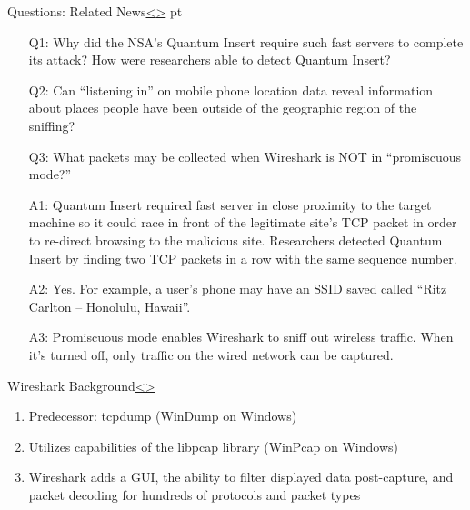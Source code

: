 \documentclass[12pt]{extarticle}
\newenvironment{instructionblock}{\Large\bgroup}{\egroup}
\newcounter{questionEnumerate}
\begin{document}
\pagebreak
\begin{slide}{Questions: Related News}{\hyperref[slide 7]{\textless}\hyperref[slide 9]{\textgreater}}
	 pt
	\begin{instructionblock}
		\begin{enumerate}
			\item[Q1:] Why did the NSA's Quantum Insert require such fast servers to complete its attack? How were researchers able to detect Quantum Insert?
			\item[Q2:] Can ``listening in'' on mobile phone location data reveal information about places people have been outside of the geographic region of the sniffing? 
			\item[Q3:] What packets may be collected when Wireshark is NOT in ``promiscuous mode?''
		\end{enumerate}
	\end{instructionblock}
\end{slide}
\vfill

\begin{enumerate}
	\item[A1:] Quantum Insert required fast server in close proximity to the target machine so it could race in front of the legitimate site's TCP packet in order to re-direct browsing to the malicious site. Researchers detected Quantum Insert by finding two TCP packets in a row with the same sequence number.
	\item[A2:] Yes. For example, a user's phone may have an SSID saved called ``Ritz Carlton -- Honolulu, Hawaii''.
	\item[A3:] Promiscuous mode enables Wireshark to sniff out wireless traffic. When it's turned off, only traffic on the wired network can be captured.
\end{enumerate}




\pagebreak
\begin{slide}{Wireshark Background}{\hyperref[slide 8]{\textless}\hyperref[slide 10]{\textgreater}}
	\begin{instructionblock}
		\begin{enumerate}
			\item Predecessor: tcpdump (WinDump on Windows)
			\item Utilizes capabilities of the libpcap library (WinPcap on Windows)
			\item Wireshark adds a GUI, the ability to filter displayed data post-capture, and packet decoding for hundreds of protocols and packet types
		\end{enumerate}
	\end{instructionblock}
\end{slide}
\vfill
\end{document}
